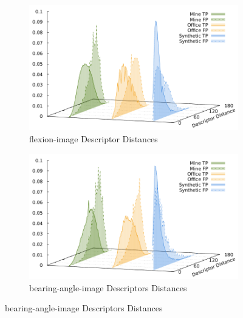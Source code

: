 \begin{figure}[H]
\begin{subfigure}[t]{0.45\linewidth}
    \includegraphics[width=\linewidth]{chapter06/results/AKAZE/flexion/descriptor_distances.pdf}%
    \caption{\gls{flexion-image} Descriptor Distances}
\end{subfigure}\quad
\begin{subfigure}[t]{0.45\linewidth}
    \includegraphics[width=\linewidth]{chapter06/results/AKAZE/bearing/descriptor_distances.pdf}%
    \caption{\gls{bearing-angle-image} Descriptors Distances}
\end{subfigure}
\end{figure}
